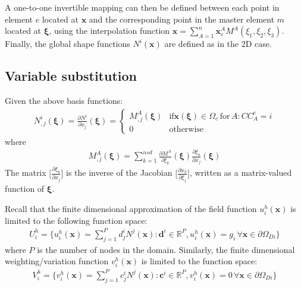 	A one-to-one invertible mapping can then be defined between each point in element $e$ located at $\bm{x}$ and the corresponding point in the master element $m$ located at $\bm{\xi}$, using the interpolation function $\bm{x} = \sum_{A=1}^{n} \bm{x}^A_e M^{A}(\xi_1, \xi_2, \xi_3)$. Finally, the global shape functions $N^i(\bm{x})$ are defined as in the 2D case.

\subsection{Variable substitution}
	Given the above basis functions: 
	\begin{align}
		N^i_{,j}(\bm{\xi}) = \frac{\partial N^i}{\partial x_j}(\bm{\xi}) = \begin{cases}
			M^A_{,j}(\bm{\xi}) & \text{if} \bm{x}(\bm{\xi}) \in \Omega_e \, \text{for} \, A: CC^e_A = i \\
			0 & \text{otherwise}
		\end{cases}
	\end{align}
	where
	\begin{align}
	    M^A_{,j}(\bm{\xi}) = \sum_{k=1}^{nsd} \frac{\partial M^A}{\partial \xi_k}(\bm{\xi}) \frac{\partial \xi_k}{\partial x_j}(\bm{\xi})
	\end{align}
	The matrix $\big[\frac{\partial \xi_k}{\partial x_j}\big]$ is the inverse of the Jacobian $\big[\frac{\partial x_k}{\partial \xi_j}\big]$, written as a matrix-valued function of $\bm{\xi}$. 

	Recall that the finite dimensional approximation of the field function $u_i^h(\bm{x})$ is limited to the following function space:
	\begin{align}
	    U_i^h = \{u^h_i(\bm{x}) = \sum_{j=1}^Pd^i_jN^j(\bm{x}):\bm{d}^i\in\mathbb{R}^{P}, u_i^h(\bm{x}) = g_i \, \forall \bm{x} \in \partial \Omega_{Di}\}
	\end{align}
	where $P$ is the number of nodes in the domain. Similarly, the finite dimensional weighting/variation function $v_i^h(\bm{x})$ is limited to the function space:
	\begin{align}
	    V_i^h = \{v^h_i(\bm{x}) = \sum_{j=1}^Pc^i_jN^j(\bm{x}): \bm{c}^i\in\mathbb{R}^{P}, v_i^h(\bm{x}) = 0 \, \forall \bm{x} \in \partial \Omega_{Di}\}
    \end{align}
	
